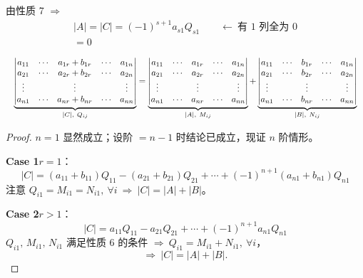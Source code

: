 
由性质 7 $\Rightarrow$
\begin{gather*}
|A|=|C|=(-1)^{s+1}a_{s1}Q_{s1}\qquad\leftarrow\ \text{有 1 列全为 } 0\\
=0
\end{gather*}

\begin{proposition}[性质 6]
\[
\resizebox{\linewidth}{!}{$\displaystyle
\underbrace{\begin{vmatrix}
a_{11} & \cdots & a_{1r}+b_{1r} & \cdots & a_{1n}\\
a_{21} & \cdots & a_{2r}+b_{2r} & \cdots & a_{2n}\\
\vdots & & \vdots & & \vdots\\
a_{n1} & \cdots & a_{nr}+b_{nr} & \cdots & a_{nn}
\end{vmatrix}}_{|C|,\ Q_{ij}}
=
\underbrace{\begin{vmatrix}
a_{11} & \cdots & a_{1r} & \cdots & a_{1n}\\
a_{21} & \cdots & a_{2r} & \cdots & a_{2n}\\
\vdots & & \vdots & & \vdots\\
a_{n1} & \cdots & a_{nr} & \cdots & a_{nn}
\end{vmatrix}}_{|A|,\ M_{ij}}
+
\underbrace{\begin{vmatrix}
a_{11} & \cdots & b_{1r} & \cdots & a_{1n}\\
a_{21} & \cdots & b_{2r} & \cdots & a_{2n}\\
\vdots & & \vdots & & \vdots\\
a_{n1} & \cdots & b_{nr} & \cdots & a_{nn}
\end{vmatrix}}_{|B|,\ N_{ij}}$}
\]
\end{proposition}

\begin{proof}
$n=1$ 显然成立；设阶 $=n-1$ 时结论已成立，现证 $n$ 阶情形。

\noindent\textbf{Case 1}\quad $r=1$：
\[
|C|=(a_{11}+b_{11})Q_{11}-(a_{21}+b_{21})Q_{21}+\cdots+(-1)^{n+1}(a_{n1}+b_{n1})Q_{n1}
\]
注意 $Q_{i1}=M_{i1}=N_{i1},\ \forall i\ \Rightarrow\ |C|=|A|+|B|$。

\noindent\textbf{Case 2}\quad $r>1$：
\[
|C|=a_{11}Q_{11}-a_{21}Q_{21}+\cdots+(-1)^{n+1}a_{n1}Q_{n1}
\]
$Q_{i1},\,M_{i1},\,N_{i1}$ 满足性质 6 的条件 $\Rightarrow\ Q_{i1}=M_{i1}+N_{i1},\ \forall i$，
\[
\Rightarrow\ |C|=|A|+|B|.
\]
\end{proof}

